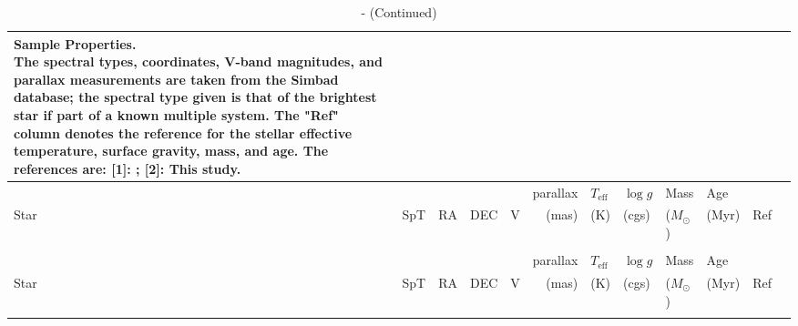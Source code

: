 \begin{tiny}
\begin{longtable}{|l|lrrrrllllll|}
    
    \caption{Sample Properties.\\
             The spectral types, coordinates, V-band magnitudes, and parallax measurements are taken from the Simbad database; the spectral type given is that of the brightest star if part of a known multiple system. The "Ref" column denotes the reference for the stellar effective temperature, surface gravity, mass, and age. The references are: [1]: \citep{David2015}; [2]: This study. \label{paper6_tab:sample}} 
    \\ \hline
      &  &  &  &  & parallax & $T_\mathrm{eff}$ & $\log{g}$ & Mass & Age &  \\
       Star & SpT & RA & DEC &  V &  (mas) & (K) & (cgs) & ($M_{\odot}$) & (Myr) & Ref \\ \hline
    \endfirsthead

    \caption{ - (Continued)}
    \\ \hline
    &  &  &  &  & parallax & $T_\mathrm{eff}$ & $\log{g}$ & Mass & Age &  \\
       Star & SpT & RA & DEC &  V &  (mas) & (K) & (cgs) & ($M_{\odot}$) & (Myr) & Ref \\ \hline
    \endhead

    \hline
    \endfoot

    \hline
    \endlastfoot


\end{longtable}
\end{tiny}
